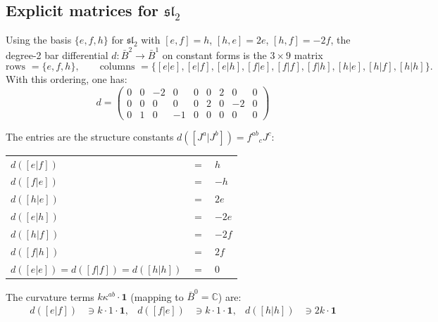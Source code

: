 \subsection{\texorpdfstring{Explicit matrices for $\mathfrak{sl}_2$}{Explicit matrices for sl2}}

\begin{computation}
\label{comp:sl2-bar-matrix}

Using the basis $\{e, f, h\}$ for $\mathfrak{sl}_2$ with
$[e,f] = h$, $[h,e] = 2e$, $[h,f] = -2f$, the degree-2
bar differential $d\colon \bar{B}^2 \to \bar{B}^1$ on constant forms
is the $3 \times 9$ matrix
\[
\text{rows } = \{e,f,h\}, \qquad
\text{columns } =
\{[e|e], [e|f], [e|h], [f|e], [f|f], [f|h], [h|e], [h|f], [h|h]\}.
\]
With this ordering, one has:
\begin{equation}\label{eq:sl2-bar-matrix}
d = \begin{pmatrix}
0 & 0 & -2 & 0 & 0 & 0 & 2 & 0 & 0 \\
0 & 0 & 0 & 0 & 0 & 2 & 0 & -2 & 0 \\
0 & 1 & 0 & -1 & 0 & 0 & 0 & 0 & 0
\end{pmatrix}
\end{equation}

The entries are the structure constants
$d([J^a|J^b]) = {f^{ab}}_c J^c$:
\begin{center}
\renewcommand{\arraystretch}{1.2}
\begin{tabular}{lcl}
$d([e|f])$ & $=$ & $h$ \\
$d([f|e])$ & $=$ & $-h$ \\
$d([h|e])$ & $=$ & $2e$ \\
$d([e|h])$ & $=$ & $-2e$ \\
$d([h|f])$ & $=$ & $-2f$ \\
$d([f|h])$ & $=$ & $2f$ \\
$d([e|e]) = d([f|f]) = d([h|h])$ & $=$ & $0$
\end{tabular}
\end{center}

The curvature terms $k\kappa^{ab}\cdot\mathbf{1}$
\textup{(}mapping to $\bar{B}^0 = \mathbb{C}$\textup{)} are:
\begin{align}
d([e|f]) &\ni k \cdot 1 \cdot \mathbf{1}, &
d([f|e]) &\ni k \cdot 1 \cdot \mathbf{1}, &
d([h|h]) &\ni 2k \cdot \mathbf{1}
\end{align}


\end{computation}
